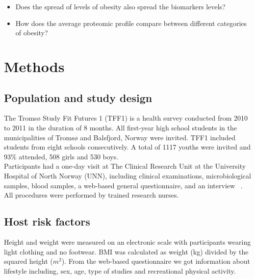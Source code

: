\documentclass[10pt, a4paper, twocolumn]{article} %
\begin{document}
\begin{itemize}

  \item Does the spread of levels of obesity also spread the biomarkers levels?\\
  
  \item How does the average proteomic profile compare between different categories of obesity?
  
\end{itemize}


 

\section{Methods}

\subsection{Population and study design}

The Tromsø Study Fit Futures 1 (TFF1) is a health survey conducted from 2010 to 2011 in the duration of 8 months. All first-year high school students in the municipalities of Tromsø and Balsfjord, Norway were invited. TFF1 included students from eight schools consecutively. A total of 1117 youths were invited and 93\% attended, 508 girls and 530 boys.\\
 
Participants had a one-day visit at The Clinical Research Unit at the University Hospital of North Norway (UNN), including clinical examinations, microbiological samples, blood samples, a web-based general questionnaire, and an interview ~\cite{ref:FitFutures}. All procedures were performed by trained research nurses.\\

\subsection{Host risk factors}

Height and weight were measured on an electronic scale with participants wearing light clothing and no footwear. BMI was calculated as weight (kg) divided by the squared height ($m^{2}$). From the web-based questionnaire we got information about lifestyle including, sex, age, type of studies and recreational physical activity.\\
\end{document}
